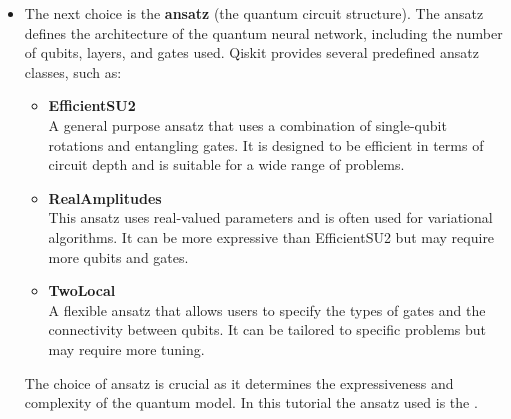 \documentclass[conference]{IEEEtran}
\begin{document}
\begin{itemize}
\begin{itemize}
        \end{itemize}
        
        These feature maps are not just about storing the features — they are essential for \textbf{embedding classical data (such as pixel values from images)} into the quantum circuit so that the quantum neural network can process it.\\


        The choice of feature map directly influences the expressiveness and performance of the quantum model. In this tutorial, the chosen feature map is the ZZFeatureMap.\\


        \item The next choice is the \textbf{ansatz} (the quantum circuit structure). The ansatz defines the architecture of the quantum neural network, including the number of qubits, layers, and gates used. Qiskit provides several predefined ansatz classes, such as:
        \begin{itemize}
            \item \textbf{EfficientSU2 \cite{qiskit_efficientsu2}} \\
            A general purpose ansatz that uses a combination of single-qubit rotations and entangling gates. It is designed to be efficient in terms of circuit depth and is suitable for a wide range of problems.
        
            \item \textbf{RealAmplitudes \cite{qiskit_realamplitudes}} \\
            This ansatz uses real-valued parameters and is often used for variational algorithms. It can be more expressive than EfficientSU2 but may require more qubits and gates.
        
            \item \textbf{TwoLocal \cite{qiskit_twolocal}} \\
            A flexible ansatz that allows users to specify the types of gates and the connectivity between qubits. It can be tailored to specific problems but may require more tuning.

        \end{itemize}

        The choice of ansatz is crucial as it determines the expressiveness and complexity of the quantum model. In this tutorial the ansatz used is the .


{\small
\begin{verbatim}


\end{verbatim}}
\end{itemize}
\end{document}
